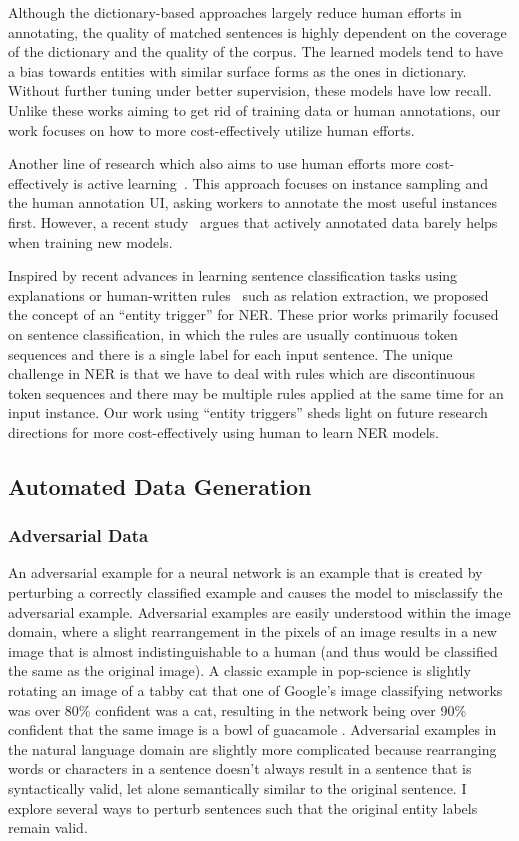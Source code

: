 Although the dictionary-based approaches largely reduce human efforts in annotating, the quality of matched sentences is highly dependent on the coverage of the dictionary and the quality of the corpus.
The learned models tend to have a bias towards entities with similar surface forms as the ones in dictionary. Without further tuning under better supervision, these models have low recall.
Unlike these works aiming to get rid of training data or human annotations, our work focuses on how to more cost-effectively utilize human efforts.

Another line of research which also aims to use human efforts more cost-effectively is active learning~\citep{shen2018deep,Lin2019AlpacaTagAA}.
This approach focuses on instance sampling and the human annotation UI, asking workers to annotate the most useful instances first.
However, a recent study~\citep{Lipton2018PracticalOT} argues that actively annotated data barely helps when training new models. 

Inspired by recent advances in learning sentence classification tasks using explanations or human-written rules~\citep{Li2018GeneralizeSK, Hancock2018TrainingCW, Wang2020Learning, Zhou2019NEROAN} such as relation extraction, we proposed the concept of an ``entity trigger'' for NER.
These prior works primarily focused on sentence classification, in which the rules are usually continuous token sequences and there is a single label for each input sentence.
The unique challenge in NER is that we have to deal with rules which are discontinuous token sequences and there may be multiple rules applied at the same time for an input instance. Our work using ``entity triggers'' sheds light on future research directions for more cost-effectively using human to learn NER models.




\subsection{Automated Data Generation}
\subsubsection{Adversarial Data}
An adversarial example for a neural network is an example that is created by perturbing a correctly classified example and causes the model to misclassify the  adversarial example. Adversarial examples are easily understood within the image domain, where a slight rearrangement in the pixels of an image results in a new image that is almost indistinguishable to a human (and thus would be classified the same as the original image). A classic example in pop-science is slightly rotating an image of a tabby cat that one of Google's image classifying networks was over 80\% confident was a cat, resulting in the network being over 90\% confident that the same image is a bowl of guacamole \citep{guacamole}. Adversarial examples in the natural language domain are slightly more complicated because rearranging words or characters in a sentence doesn't always result in a sentence that is syntactically valid, let alone semantically similar to the original sentence. I explore several ways to perturb sentences such that the original entity labels remain valid.

